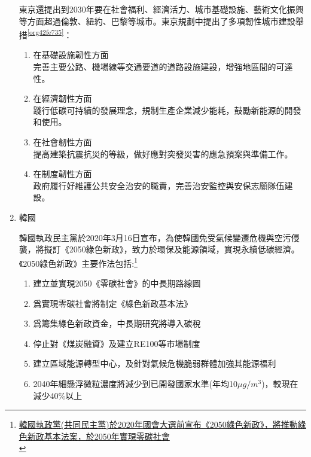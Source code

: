 \documentclass[a4paper,12pt]{article}
\begin{document}
\begin{enumerate}
東京還提出到2030年要在社會福利、經濟活力、城市基礎設施、藝術文化振興等方面超過倫敦、紐約、巴黎等城市。東京規劃中提出了多項韌性城市建設舉措\textsuperscript{\ref{org42fe735}}：\\
\begin{enumerate}
\item 在基礎設施韌性方面\\
完善主要公路、機場線等交通要道的道路設施建設，增強地區間的可達性。\\
\item 在經濟韌性方面\\
踐行低碳可持續的發展理念，規制生產企業減少能耗，鼓勵新能源的開發和使用。\\
\item 在社會韌性方面\\
提高建築抗震抗災的等級，做好應對突發災害的應急預案與準備工作。\\
\item 在制度韌性方面\\
政府履行好維護公共安全治安的職責，完善治安監控與安保志願隊伍建設。\\
\end{enumerate}

\item 韓國
\label{sec:org4a59b0c}

韓國執政民主黨於2020年3月16日宣布，為使韓國免受氣候變遷危機與空污侵襲，將擬訂《2050綠色新政》，致力於環保及能源領域，實現永續低碳經濟。《2050綠色新政》主要作法包括:\footnote{\href{https://km.twenergy.org.tw/Data/db\_more?id=3758}{韓國執政黨(共同民主黨)於2020年國會大選前宣布《2050綠色新政》，將推動綠色新政基本法案，於2050年實現零碳社會}\\\label{orge69a7c8}}\\
\begin{enumerate}
\item 建立並實現2050《零碳社會》的中長期路線圖\\
\item 爲實現零碳社會將制定《綠色新政基本法》\\
\item 爲籌集綠色新政資金，中長期研究將導入碳稅\\
\item 停止對《煤炭融資》及建立RE100等市場制度\\
\item 建立區域能源轉型中心，及針對氣候危機脆弱群體加強其能源福利\\
\item 2040年細懸浮微粒濃度將減少到已開發國家水準(年均10\({\mu}g/m^3\))，較現在減少40\%以上\\
\end{enumerate}


\end{enumerate}
\end{document}
